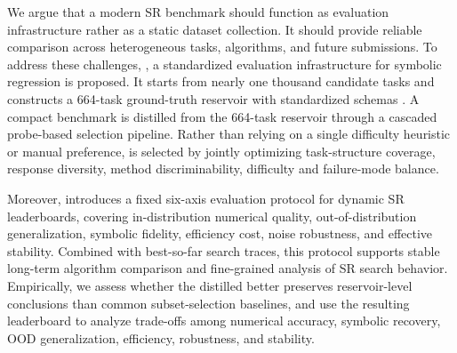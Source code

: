 We argue that a modern SR benchmark should function as evaluation infrastructure rather as a static dataset collection. It should provide reliable comparison across heterogeneous tasks, algorithms, and future submissions. %
%
To address these challenges, \arena{}, a standardized evaluation infrastructure for symbolic regression is proposed. It starts from nearly one thousand candidate tasks and constructs a 664-task ground-truth reservoir with standardized schemas%
. A compact \core{} benchmark is distilled from the 664-task reservoir through a cascaded probe-based selection pipeline. Rather than relying on a single difficulty heuristic or manual preference, \core{} is selected by jointly optimizing task-structure coverage, response diversity, method discriminability, difficulty and failure-mode balance. 

Moreover, \arena{} introduces a fixed six-axis evaluation protocol for dynamic SR leaderboards, covering in-distribution numerical quality, out-of-distribution generalization, symbolic fidelity, efficiency cost, noise robustness, and effective stability. Combined with best-so-far search traces, this protocol supports stable long-term algorithm comparison and fine-grained analysis of SR search behavior. Empirically, we assess whether the distilled \core{} better preserves reservoir-level conclusions than common subset-selection baselines, and use the resulting leaderboard to analyze trade-offs among numerical accuracy, symbolic recovery, OOD generalization, efficiency, robustness, and stability.

